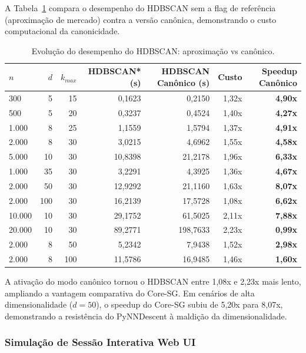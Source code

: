 \documentclass[12pt,a4paper,oneside]{article}
\begin{document}
A Tabela~\ref{tab:evolucao_hdbscan} compara o desempenho do HDBSCAN sem a flag de referência
(aproximação de mercado) contra a versão canônica, demonstrando o custo computacional da
canonicidade.

\begin{table}[H]
  \centering
  \caption{Evolução do desempenho do HDBSCAN: aproximação vs canônico.}
  \label{tab:evolucao_hdbscan}
  \begin{tabular}{lrrrrrr}
    \toprule
    \textbf{$n$} & \textbf{$d$} & \textbf{$k_{max}$} &
    \textbf{HDBSCAN* (s)} & \textbf{HDBSCAN Canônico (s)} &
    \textbf{Custo} & \textbf{Speedup Canônico} \\
    \midrule
    300 & 5 & 15 & 0,1623 & 0,2150 & 1,32x & \textbf{4,90x} \\
    500 & 5 & 20 & 0,3237 & 0,4524 & 1,40x & \textbf{4,27x} \\
    1.000 & 8 & 25 & 1,1559 & 1,5794 & 1,37x & \textbf{4,91x} \\
    2.000 & 8 & 30 & 3,0215 & 4,6962 & 1,55x & \textbf{4,58x} \\
    5.000 & 10 & 30 & 10,8398 & 21,2178 & 1,96x & \textbf{6,33x} \\
    1.000 & 35 & 30 & 3,2291 & 4,3925 & 1,36x & \textbf{4,67x} \\
    2.000 & 50 & 30 & 12,9292 & 21,1160 & 1,63x & \textbf{8,07x} \\
    2.000 & 100 & 30 & 16,2139 & 17,5728 & 1,08x & \textbf{6,62x} \\
    10.000 & 10 & 30 & 29,1752 & 61,5025 & 2,11x & \textbf{7,88x} \\
    20.000 & 10 & 30 & 89,2771 & 198,7633 & 2,23x & \textbf{0,99x} \\
    2.000 & 8 & 50 & 5,2342 & 7,9438 & 1,52x & \textbf{2,98x} \\
    2.000 & 8 & 100 & 11,5786 & 16,9485 & 1,46x & \textbf{1,60x} \\
    \bottomrule
  \end{tabular}
\end{table}

A ativação do modo canônico tornou o HDBSCAN entre 1,08x e 2,23x mais lento, ampliando a
vantagem comparativa do Core-SG. Em cenários de alta dimensionalidade ($d=50$), o speedup do
Core-SG subiu de 5,20x para 8,07x, demonstrando a resistência do PyNNDescent à maldição da
dimensionalidade.

\subsubsection{Simulação de Sessão Interativa Web UI}
\end{document}
